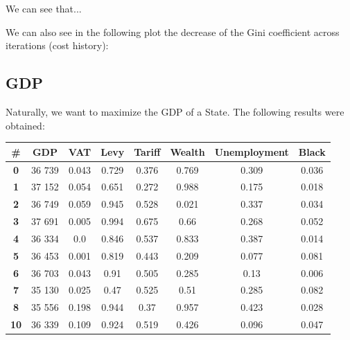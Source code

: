         We can see that... %

        We can also see in the following plot the decrease of the Gini coefficient across iterations (cost history):

        


    \subsection{GDP}

        Naturally, we want to maximize the GDP of a State. The following results were obtained:
    
        \begin{table}[H]
        \centering
        \begin{tabular}{|c|c|c|c|c|c|c|c|}
            \hline
            \textbf{\#} & \textbf{GDP}  & \textbf{VAT} & \textbf{Levy} & \textbf{Tariff} & \textbf{Wealth} & \textbf{Unemployment} & \textbf{Black} \\ \hline
            \textbf{0} & 36 739 & 0.043 & 0.729 & 0.376 & 0.769 & 0.309 & 0.036 \\ \hline
            \textbf{1} & 37 152 & 0.054 & 0.651 & 0.272 & 0.988 & 0.175 & 0.018 \\ \hline
            \textbf{2} & 36 749 & 0.059 & 0.945 & 0.528 & 0.021 & 0.337 & 0.034 \\ \hline
            \textbf{3} & 37 691 & 0.005 & 0.994 & 0.675 & 0.66 & 0.268 & 0.052 \\ \hline
            \textbf{4} & 36 334 & 0.0 & 0.846 & 0.537 & 0.833 & 0.387 & 0.014 \\ \hline
            \textbf{5} & 36 453 & 0.001 & 0.819 & 0.443 & 0.209 & 0.077 & 0.081 \\ \hline
            \textbf{6} & 36 703 & 0.043 & 0.91 & 0.505 & 0.285 & 0.13 & 0.006 \\ \hline
            \textbf{7} & 35 130 & 0.025 & 0.47 & 0.525 & 0.51 & 0.285 & 0.082 \\ \hline
            \textbf{8} & 35 556 & 0.198 & 0.944 & 0.37 & 0.957 & 0.423 & 0.028 \\ \hline
            \textbf{10} & 36 339 & 0.109 & 0.924 & 0.519 & 0.426 & 0.096 & 0.047 \\ \hline
        \end{tabular}
        \end{table}

